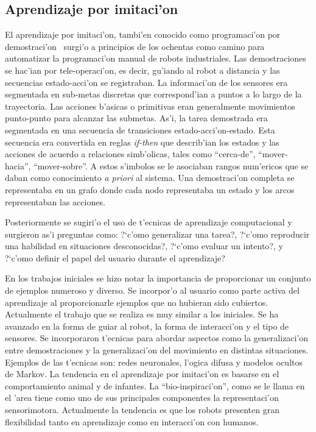 \documentclass[11pt]{article}
\begin{document}
\subsection{Aprendizaje por imitaci'on}
 El \textsf{aprendizaje por imitaci'on}, tambi'en conocido como \textsf{programaci'on por demostraci'on}~\cite{aude:pbd} surgi'o a principios de los ochentas como camino para automatizar la programaci'on manual de robots industriales. Las demostraciones se hac'ian por tele-operaci'on, es decir, gu'iando al robot a distancia y las secuencias estado-acci'on se registraban. La informaci'on de los sensores era segmentada en sub-metas discretas que correspond'ian a puntos a lo largo de la trayectoria. Las acciones b'asicas o primitivas eran generalmente movimientos punto-punto para alcanzar las submetas. As'i, la tarea demostrada era segmentada en una secuencia de transiciones estado-acci'on-estado. Esta secuencia era convertida en reglas \textit{if-then} que describ'ian los estados y las acciones de acuerdo a relaciones simb'olicas, tales como ``cerca-de'', ``mover-hacia'', ``mover-sobre''. A estos s'imbolos se le asociaban rangos num'ericos que se daban como conocimiento \textit{a priori} al sistema.  Una demostraci'on completa se representaba en un grafo donde cada nodo representaba un estado y los arcos representaban las acciones. 

Posteriormente se sugiri'o el uso de t'ecnicas de aprendizaje computacional y surgieron as'i preguntas como: ?`c'omo generalizar una tarea?, ?`c'omo reproducir una habilidad en situaciones desconocidas?, ?`c'omo evaluar un intento?, y ?`c'omo definir el papel del usuario durante el aprendizaje?

En los trabajos iniciales se hizo notar la importancia de proporcionar un conjunto de ejemplos numeroso y diverso. Se incorpor'o al usuario como parte activa del aprendizaje al proporcionarle ejemplos que no hubieran sido cubiertos. Actualmente el trabajo que se realiza es muy similar a los iniciales. Se ha avanzado en la forma de guiar al robot, la forma de interacci'on y el tipo de sensores. Se incorporaron t'ecnicas para abordar aspectos como la generalizaci'on entre demostraciones y la generalizaci'on del movimiento en distintas situaciones. Ejemplos de las t'ecnicas son: redes neuronales, l'ogica difusa y modelos ocultos de Markov. La tendencia en el \textsf{aprendizaje por imitaci'on} es basarse en el comportamiento animal y de infantes. La ``bio-inspiraci'on'', como se le llama en el 'area tiene como uno de sus principales componentes la representaci'on sensorimotora. Actualmente la tendencia es que los robots presenten gran flexibilidad tanto en aprendizaje como en interacci'on con humanos. 
\end{document}
